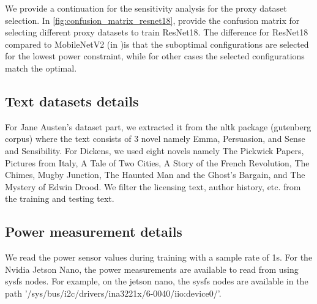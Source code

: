We provide a continuation for the sensitivity analysis for the proxy dataset selection. In \cref{fig:confusion_matrix_resnet18}, provide the confusion matrix for selecting different proxy datasets to train ResNet18. The difference for ResNet18 compared to MobileNetV2 (in )is that the suboptimal configurations are selected for the lowest power constraint, while for other cases the selected configurations match the optimal. 




\subsection{Text datasets details}
\label{appendix:text_datasets}
For Jane Austen's dataset part, we extracted it from the nltk package (gutenberg corpus) where the text consists of 3 novel namely Emma, Persuasion, and Sense and Sensibility.  For Dickens, we used eight novels namely The Pickwick Papers, Pictures from Italy,  A Tale of Two Cities, A Story of the French Revolution, The Chimes, Mugby Junction, The Haunted Man and the Ghost's Bargain, and The Mystery of Edwin Drood.
We filter the licensing text, author history, etc. from the training and testing text.
    
\subsection{Power measurement details}

We read the power sensor values during training with a sample rate of 1\si{\second}. For the Nvidia Jetson Nano, the power measurements are available to read from using sysfs nodes. For example, on the jetson nano, the sysfs nodes are available in the path '/sys/bus/i2c/drivers/ina3221x/6-0040/iio:device0/'. 










